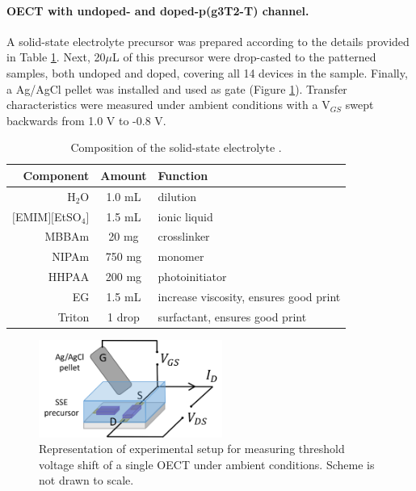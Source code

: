 \paragraph{OECT with undoped- and doped-p(g3T2-T) channel.} A solid-state electrolyte precursor was prepared according to the details provided in Table \ref{tab:sse}. Next, 20$\mu$L of this precursor were drop-casted to the patterned samples, both undoped and doped, covering all 14 devices in the sample. Finally, a Ag/AgCl pellet was installed and used as gate (Figure \ref{fig:biosetup}). Transfer characteristics were measured under ambient conditions with a V$_{GS}$ swept backwards from 1.0 V to -0.8 V. %

\begin{table}[h]
	\centering
	\caption{Composition of the solid-state electrolyte \cite{weissbachPhotopatternableSolidElectrolyte2022}.}
	\begin{tabular}{r c l} \hline
		Component   & Amount & Function \\ \hline
		H$_{2}$O	& 1.0 mL & dilution \\ 
		$[$EMIM$][$EtSO$_{4}]$   & 1.5 mL & ionic liquid \\ 
		MBBAm   & 20 mg & crosslinker \\ 
		NIPAm   & 750 mg & monomer \\ 
		HHPAA   & 200 mg & photoinitiator \\
		EG	& 1.5 mL	& increase viscosity, ensures good print \\ 
		Triton & 1 drop & surfactant, ensures good print \\  \hline
	\end{tabular}
	\label{tab:sse}
\end{table}

\begin{figure}[!ht]
	\centering
	\includegraphics[width=6cm]{Images/pdf/bioprobe_setup.pdf}
	\caption{Representation of experimental setup for measuring threshold voltage shift of a single OECT under ambient conditions. Scheme is not drawn to scale.}
	\label{fig:biosetup}
\end{figure}

